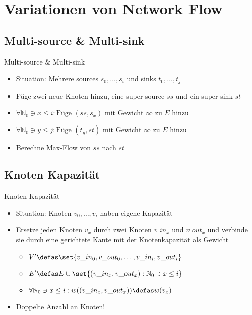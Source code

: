 \section{Variationen von Network Flow}
\subsection{Multi-source \& Multi-sink}
\begin{frame}{Multi-source \& Multi-sink}
    \begin{itemize}
        \pause\item Situation: Mehrere sources $s_0,\dots,s_i$ und sinks $t_0,\dots,t_j$
        \pause\item Füge zwei neue Knoten hinzu, eine super source $ss$ und ein super sink $st$
        \pause\item \(\forall \mathbb{N}_0 \ni x \leq i : \text{Füge } (ss, s_x) \text{ mit
        Gewicht $\infty$ zu $E$ hinzu}\)
        \item \(\forall \mathbb{N}_0 \ni y \leq j : \text{Füge } (t_y, st) \text{ mit
        Gewicht $\infty$ zu $E$ hinzu}\)
        \pause\item Berechne Max-Flow von $ss$ nach $st$
    \end{itemize}
\end{frame}

\subsection{Knoten Kapazität}
\begin{frame}{Knoten Kapazität}
    \begin{itemize}
        \pause\item Situation: Knoten $v_0,\dots,v_i$ haben eigene Kapazität
        \pause\item Ersetze jeden Knoten $v_x$ durch zwei Knoten $v\_in_x$ und $v\_out_x$ und verbinde sie durch eine gerichtete Kante mit der Knotenkapazität als Gewicht
		\begin{itemize}        
        \pause\item \(V' \defas \set{v\_in_0, v\_out_0, \dots, v\_in_i, v\_out_i}\)
        \pause\item \(E' \defas E \cup \set{(v\_in_x, v\_out_x) : \mathbb{N}_0 \ni x \leq i}\)
        \pause\item \(\forall \mathbb{N}_0 \ni x \leq i : w((v\_in_x, v\_out_x)) \defas w(v_x)\)
        \end{itemize}
        \pause\item Doppelte Anzahl an Knoten!
    \end{itemize}
\end{frame}


